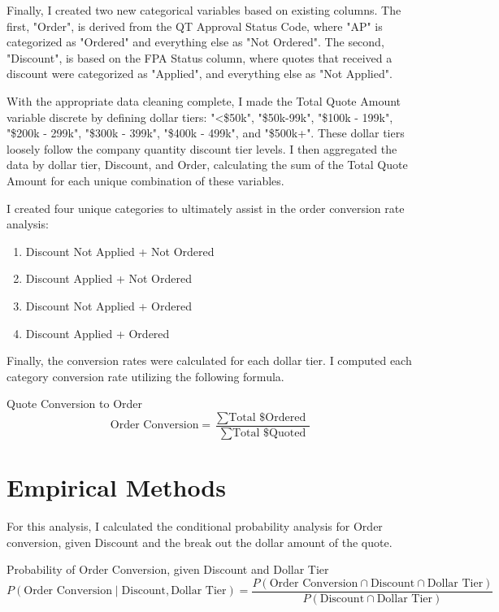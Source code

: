 \documentclass[12pt,english]{article}
\begin{document}
Finally,  I created two new categorical variables based on existing columns. The first, "Order", is derived from the QT Approval Status Code, where "AP" is categorized as "Ordered" and everything else as "Not Ordered". The second, "Discount", is based on the FPA Status column, where quotes that received a discount were categorized as "Applied", and everything else as "Not Applied".

With the appropriate data cleaning complete, I made the Total Quote Amount variable discrete by defining dollar tiers: "<\$50k", "\$50k-99k", "\$100k - 199k", "\$200k - 299k", "\$300k - 399k", "\$400k - 499k", and "\$500k+". These dollar tiers loosely follow the company quantity discount tier levels.  I then aggregated the data by dollar tier, Discount, and Order, calculating the sum of the Total Quote Amount for each unique combination of these variables.

I created four unique categories to ultimately assist in the order conversion rate analysis:
\begin{enumerate}[itemsep=0pt, topsep=0pt, partopsep=0pt, parsep=0pt]
    \item Discount Not Applied + Not Ordered
    \item Discount Applied + Not Ordered
    \item Discount Not Applied + Ordered
    \item Discount Applied + Ordered
\end{enumerate}

Finally, the conversion rates were calculated for each dollar tier. I computed each category conversion rate utilizing the following formula.

Quote Conversion to Order
\begin{equation}
\text{Order Conversion} = \frac{\sum \text{Total \$ Ordered }}{\sum \text{Total \$ Quoted}}
\end{equation}

\section{Empirical Methods}

For this analysis, I calculated the conditional probability analysis for Order conversion, given Discount and the break out the dollar amount of the quote.

Probability of Order Conversion, given Discount and Dollar Tier
\begin{equation}
P(\text{Order Conversion} \mid \text{Discount}, \text{Dollar Tier}) = \frac{P(\text{Order Conversion} \cap \text{Discount} \cap \text{Dollar Tier})}{P(\text{Discount} \cap \text{Dollar Tier})}
\end{equation}
\end{document}
